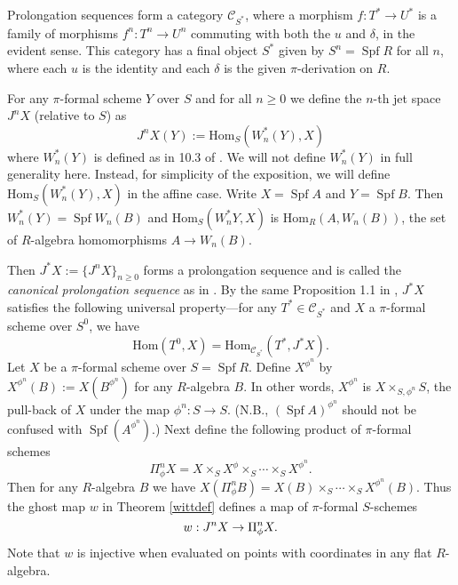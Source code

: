 \documentclass{amsart}
\numberwithin{equation}{section}
\DeclareMathOperator{\Spf}{\mathrm{Spf}}
\newcommand{\Hom}{\mathrm{Hom}}
\def \d{\delta}
\newcommand{\mcal}[1]{\mathcal{#1}}
\begin{document}
Prolongation sequences form a category $\mcal{C}_{S^*}$, where a morphism $f:T^*\to U^*$ is 
a family of morphisms $f^n:T^n\to U^n$ commuting with both the $u$ and $\d$, in the evident sense.
This category has a final object $S^*$ given by $S^n=\Spf R$ for all $n$, where each $u$ is the identity and
each $\d$ is the given $\pi$-derivation on $R$.

For any $\pi$-formal scheme $Y$ over $S$ and for all $n \geq 0$ we define the 
$n$-th jet space $J^nX$ (relative to $S$) as 
	$$
	J^nX (Y) := \Hom_S(W_n^*(Y),X)
	$$
where $W_n^*(Y)$ is defined as in 10.3 of \cite{MR2854117}. We will not define 
$W_n^*(Y)$ in full generality here. 
Instead, for simplicity of the exposition,
we will define $\Hom_S(W_n^*(Y),X)$ in the affine case.
Write $X = \Spf A$ and $Y=\Spf B$. Then $W_n^*(Y)= \Spf W_n(B)$ and $\Hom_S(W_{n}^*Y,X)$ is 
$\Hom_R(A,W_n(B))$, the set of $R$-algebra homomorphisms $A\to W_n(B)$.

Then $J^*X:= \{J^nX \}_{n \geq 0}$ forms a prolongation sequence and is 
called the {\it canonical prolongation sequence} as in 
\cite[Proposition 1,1]{MR1748272}. By the same Proposition 1.1 in 
\cite{MR1748272}, $J^*X$ satisfies the following 
universal property---for any $T^* \in \mcal{C}_{S^*}$ and $X$ a $\pi$-formal
scheme over 
$S^0$, we have
\begin{equation}	
\label{canprouniv}
	\Hom(T^0,X) = \Hom_{\mcal{C}_{S^*}}(T^*, J^*X).
\end{equation}	
Let $X$ be a $\pi$-formal scheme over
$S= \Spf R$. Define $X^{\phi^n}$ by $X^{\phi^n}(B) := X(B^{\phi^n})$ for any $R$-algebra $B$.
In other words, $X^{\phi^n}$ is $X \times_{S,\phi^n} S$, the pull-back of $X$ under the map $\phi^n:S\to S$.
(N.B., $(\Spf A)^{\phi^n}$ should not be confused with $\Spf (A^{\phi^n})$.)
Next define the following product of $\pi$-formal schemes
        $$
        \Pi^n_{\phi} X= X \times_S X^{\phi} \times_S \cdots \times_S X^{\phi^n}.
        $$
Then for any $R$-algebra $B$ we have $X(\Pi_{\phi}^n B) = X(B)\times_S \cdots \times_S X^{\phi^n}(B)$.
Thus the ghost map $w$ in Theorem \ref{wittdef} defines a map of $\pi$-formal
$S$-schemes
        $$
        w:J^nX \rightarrow \Pi_{\phi}^nX.
        $$
Note that $w$ is injective when evaluated on points with coordinates in any flat $R$-algebra.
\end{document}
